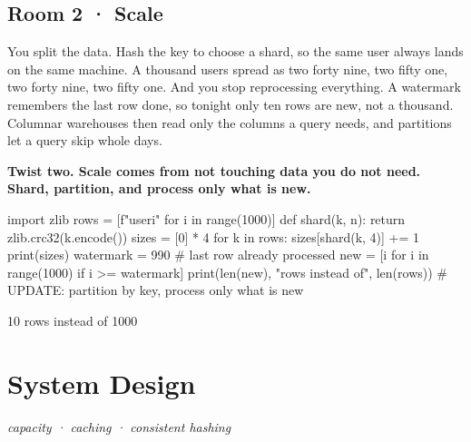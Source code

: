 \documentclass[11pt,a4paper]{report}
\begin{document}
\section*{Room 2 · Scale}
You split the data. Hash the key to choose a shard, so the same user always lands on the same machine. A thousand users spread as two forty nine, two fifty one, two forty nine, two fifty one. And you stop reprocessing everything. A watermark remembers the last row done, so tonight only ten rows are new, not a thousand. Columnar warehouses then read only the columns a query needs, and partitions let a query skip whole days.
\begin{tcolorbox}[colback=yellow!12,colframe=orange!70!black,boxrule=0.4pt,left=4pt,right=4pt,top=2pt,bottom=2pt]\textbf{Twist two. Scale comes from not touching data you do not need. Shard, partition, and process only what is new.}\end{tcolorbox}
\begin{Code}
import zlib
rows = [f"user{i}" for i in range(1000)]
def shard(k, n): return zlib.crc32(k.encode()) %
sizes = [0] * 4
for k in rows: sizes[shard(k, 4)] += 1
print(sizes)
watermark = 990                             # last row already processed
new = [i for i in range(1000) if i >= watermark]
print(len(new), "rows instead of", len(rows))
# UPDATE: partition by key, process only what is new
\end{Code}
\begin{Out}
[249, 251, 249, 251]
10 rows instead of 1000
\end{Out}
\chapter{System Design}
\textit{capacity · caching · consistent hashing}
\end{document}

